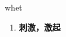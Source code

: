 
\begin{frame}
{\huge whet}
\begin{center}
\begin{enumerate}\Large
  \item \textbf{刺激，激起}
\end{enumerate}
\end{center}
\end{frame}

